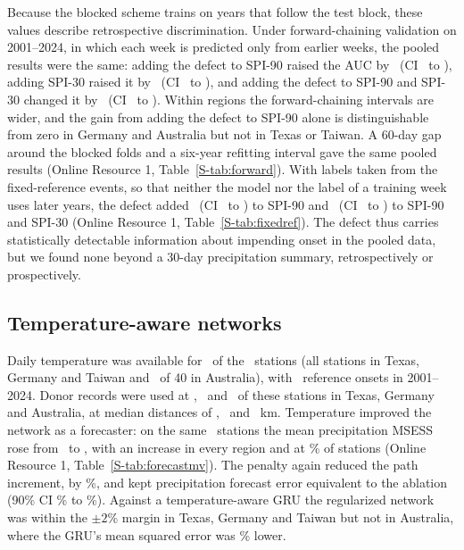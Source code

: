 \documentclass[pdflatex,sn-mathphys-ay]{sn-jnl}
\theoremstyle{thmstyletwo}
\begin{document}
Because the blocked scheme trains on years that follow the test block, these values describe
retrospective discrimination. Under forward-chaining validation on 2001--2024, in which each week is
predicted only from earlier weeks, the pooled results were the same: adding the defect to SPI-90 raised
the AUC by \fwddaucallDone\ (CI \fwddaucloallDone\ to \fwddauchiallDone), adding SPI-30 raised it by
\fwddaucallSPIthirty\ (CI \fwddaucloallSPIthirty\ to \fwddauchiallSPIthirty), and adding the defect to
SPI-90 and SPI-30 changed it by \fwddaucallSPIthirtypDone\ (CI \fwddaucloallSPIthirtypDone\ to
\fwddauchiallSPIthirtypDone). Within regions the forward-chaining intervals are wider, and the gain from
adding the defect to SPI-90 alone is distinguishable from zero in Germany and Australia but not in Texas
or Taiwan. A 60-day gap around the blocked folds and a six-year refitting interval gave the same pooled
results (Online Resource 1, Table~\ref{S-tab:forward}). With labels taken from the fixed-reference
events, so that neither the model nor the label of a training week uses later years, the defect added
\fixdaucDone\ (CI \fixdaucloDone\ to \fixdauchiDone) to SPI-90 and \fixdaucSPIthirtypDone\ (CI
\fixdaucloSPIthirtypDone\ to \fixdauchiSPIthirtypDone) to SPI-90 and SPI-30 (Online Resource 1,
Table~\ref{S-tab:fixedref}). The defect thus carries statistically detectable
information about impending onset in the pooled data, but we found none beyond a 30-day precipitation
summary, retrospectively or prospectively.



\subsection{Temperature-aware networks}\label{sec:mv}
Daily temperature was available for \mvnst\ of the \nstall\ stations (all stations in Texas, Germany
and Taiwan and \mvnstaustralia\ of 40 in Australia), with \mvnevall\ reference onsets in 2001--2024.
Donor records were used at \ndonortexas, \ndonorgermany\ and \ndonoraustralia\ of these stations in
Texas, Germany and Australia, at median distances of \kmdonortexas, \kmdonorgermany\ and
\kmdonoraustralia~km. Temperature improved the network as a forecaster: on the same \mvnst\ stations
the mean precipitation MSESS rose from \mvmsssp\ to \mvmsssmv, with an increase in every region and at
\mvmsssfrac\% of stations (Online Resource 1, Table~\ref{S-tab:forecastmv}). The penalty again reduced the path increment, by
\mvqpathred\%, and kept precipitation forecast error equivalent to the ablation (90\% CI \mvmselo\% to
\mvmsehi\%). Against a temperature-aware GRU the regularized network was within the $\pm2\%$ margin in Texas, Germany
and Taiwan but not in Australia, where the GRU's mean squared error was \mvgruaustralia\% lower.
\end{document}
